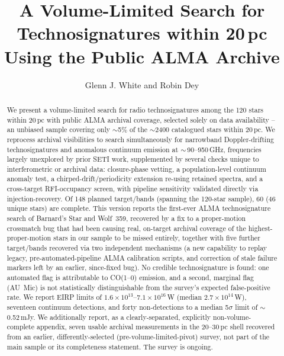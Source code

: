 \documentclass{openjournal}
\begin{document}
\title{A Volume-Limited Search for Technosignatures within 20\,pc Using the Public ALMA Archive}

\author{Glenn J. White and Robin Dey}

\begin{abstract}
We present a volume-limited search for radio technosignatures among the
120 stars within 20\,pc with public ALMA archival coverage, selected
solely on data availability -- an unbiased sample covering only
$\sim$5\% of the $\sim$2400 catalogued stars within 20\,pc. We reprocess
archival visibilities to search simultaneously for narrowband
Doppler-drifting technosignatures and anomalous continuum emission at
$\sim$\,90--950\,GHz, frequencies largely unexplored by prior SETI work,
supplemented by several checks unique to interferometric or archival
data: closure-phase vetting, a population-level continuum anomaly test,
a chirped-drift/periodicity extension re-using retained spectra, and a
cross-target RFI-occupancy screen, with pipeline sensitivity validated
directly via injection-recovery. Of 148 planned target/bands (spanning
the 120-star sample), 60 (46 unique stars) are complete. This version
reports the first-ever ALMA technosignature search of Barnard's Star and
Wolf~359, recovered by a fix to a proper-motion crossmatch bug that had
been causing real, on-target archival coverage of the highest-proper-motion
stars in our sample to be missed entirely, together with five further
target/bands recovered via two independent mechanisms (a new capability to
replay legacy, pre-automated-pipeline ALMA calibration scripts, and
correction of stale failure markers left by an earlier, since-fixed bug).
No credible technosignature is found: one automated flag is attributable to
CO(1--0) emission, and a second, marginal flag (AU~Mic) is not
statistically distinguishable from the survey's expected false-positive
rate. We report EIRP limits of
$1.6\times10^{13}$--$7.1\times10^{16}$\,W (median $2.7\times10^{14}$\,W),
seventeen continuum detections, and forty non-detections to a median
5$\sigma$ limit of $\sim$\,0.52\,mJy. We additionally report, as a
clearly-separated, explicitly non-volume-complete appendix, seven usable
archival measurements in the 20--30\,pc shell recovered from an earlier,
differently-selected (pre-volume-limited-pivot) survey, not part of the
main sample or its completeness statement. The survey is ongoing.
\end{abstract}
\end{document}

